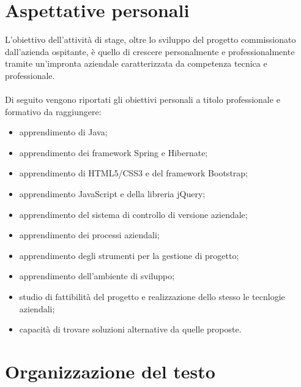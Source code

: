 \section{Aspettative personali}
L'obiettivo dell'attività di stage, oltre lo sviluppo del progetto commissionato dall'azienda ospitante, è quello di crescere personalmente e professionalmente tramite un'impronta aziendale caratterizzata da competenza tecnica e professionale.
\\
\\
Di seguito vengono riportati gli obiettivi personali a titolo professionale e formativo da raggiungere:
\begin{itemize}
\item apprendimento di Java;
\item apprendimento dei framework Spring e Hibernate;
\item apprendimento di HTML5/CSS3 e del framework Bootstrap;
\item apprendimento JavaScript e della libreria jQuery;
\item apprendimento del sistema di controllo di versione aziendale;
\item apprendimento dei processi aziendali;
\item apprendimento degli strumenti per la gestione di progetto;
\item apprendimento dell’ambiente di sviluppo;
\item studio di fattibilità del progetto e realizzazione dello stesso le tecnlogie aziendali;
\item capacità di trovare soluzioni alternative da quelle proposte.
\end{itemize}

\section{Organizzazione del testo}

